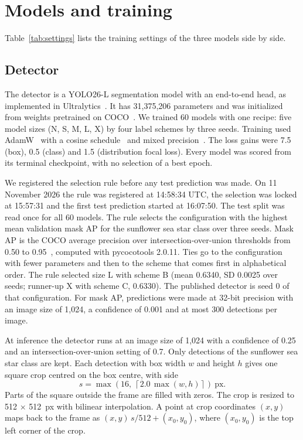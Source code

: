 \section*{Models and training}

Table~\ref{tab:settings} lists the training settings of the three models side by side.

\subsection*{Detector}

The detector is a YOLO26-L segmentation model with an end-to-end head, as implemented in Ultralytics~\cite{jocher2026ultralytics}.
It has 31,375,206 parameters and was initialized from weights pretrained on COCO~\cite{lin2014microsoft}.
We trained 60 models with one recipe: five model sizes (N, S, M, L, X) by four label schemes by three seeds.
Training used AdamW~\cite{loshchilov2019decoupled} with a cosine schedule~\cite{loshchilov2017sgdr} and mixed precision~\cite{micikevicius2018mixed}.
The loss gains were 7.5 (box), 0.5 (class) and 1.5 (distribution focal loss).
Every model was scored from its terminal checkpoint, with no selection of a best epoch.

We registered the selection rule before any test prediction was made.
On 11 November 2026 the rule was registered at 14:58:34 UTC, the selection was locked at 15:57:31 and the first test prediction started at 16:07:50.
The test split was read once for all 60 models.
The rule selects the configuration with the highest mean validation mask AP for the sunflower sea star class over three seeds.
Mask AP is the COCO average precision over intersection-over-union thresholds from 0.50 to 0.95~\cite{lin2014microsoft}, computed with pycocotools 2.0.11.
Ties go to the configuration with fewer parameters and then to the scheme that comes first in alphabetical order.
The rule selected size L with scheme B (mean 0.6340, SD 0.0025 over seeds; runner-up X with scheme C, 0.6330).
The published detector is seed 0 of that configuration.
For mask AP, predictions were made at 32-bit precision with an image size of 1,024, a confidence of 0.001 and at most 300 detections per image.

At inference the detector runs at an image size of 1,024 with a confidence of 0.25 and an intersection-over-union setting of 0.7.
Only detections of the sunflower sea star class are kept.
Each detection with box width $w$ and height $h$ gives one square crop centred on the box centre, with side
\begin{equation}
s = \max\!\left(16,\ \left\lceil 2.0\,\max(w,h)\right\rceil\right)\ \text{px}.
\label{eq:s1crop}
\end{equation}
Parts of the square outside the frame are filled with zeros.
The crop is resized to 512 $\times$ 512~px with bilinear interpolation.
A point at crop coordinates $(x, y)$ maps back to the frame as $(x, y)\,s/512 + (x_0, y_0)$, where $(x_0, y_0)$ is the top left corner of the crop.

